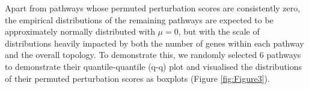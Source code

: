 \documentclass[9pt,a4paper,]{extarticle}
\newenvironment{Shaded}{\begin{snugshade}}{\end{snugshade}}
\newcommand{\AttributeTok}[1]{\textcolor[rgb]{0.13,0.29,0.53}{#1}}
\newcommand{\FunctionTok}[1]{\textcolor[rgb]{0.13,0.29,0.53}{\textbf{#1}}}
\newcommand{\NormalTok}[1]{#1}
\newcommand{\OtherTok}[1]{\textcolor[rgb]{0.56,0.35,0.01}{#1}}
\newcommand{\SpecialCharTok}[1]{\textcolor[rgb]{0.81,0.36,0.00}{\textbf{#1}}}
\begin{document}
\begin{Shaded}
\end{Shaded}

Apart from pathways whose permuted perturbation scores are consistently zero, the empirical distributions of the remaining pathways are expected to be approximately normally distributed with \(\mu = 0\), but with the scale of distributions heavily impacted by both the number of genes within each pathway and the overall topology.
To demonstrate this, we randomly selected 6 pathways to demonstrate their quantile-quantile (q-q) plot and visualised the distributions of their permuted perturbation scores as boxplots (Figure \ref{fig:Figure3}).
\end{document}

